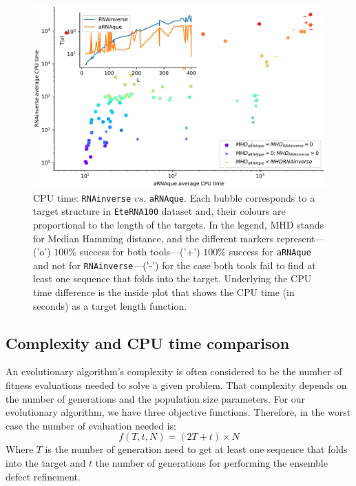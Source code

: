 \begin{figure}[t!]
	\begin{center}
		\includegraphics[width=0.98\columnwidth]{../res/images/arnaque/cpuvssuccess.pdf}
		\caption{{CPU time: \texttt{RNAinverse} $vs.$ \texttt{aRNAque}. Each bubble corresponds to a target structure in \texttt{EteRNA100} dataset and, their colours are proportional to the length of the targets. In the legend, MHD stands for Median Hamming distance, and the different markers represent---('o') $100\%$ success for both tools---('+') $100\%$ success for \texttt{aRNAque} and not for \texttt{RNAinverse}---('-') for the case both tools fail to find at least one sequence that folds into the target. Underlying the CPU time difference is the inside plot that shows the CPU time (in seconds) as a target length function.}}
		\label{719148}
	\end{center}
\end{figure}
\subsection{Complexity and CPU time comparison}
{\label{101705}}

An evolutionary algorithm's complexity is often considered to be the number of fitness evaluations needed to solve a given problem. That complexity depends on the number of generations and the population size parameters. For our evolutionary algorithm, we have three objective functions. Therefore, in the worst case the number of evaluation needed is:~ \[f\left(T,t,N\right)=\left(2T+t\right)\times N\]
Where \(T\) is the number of generation need to get at least one sequence that folds into the target and \(t\) the number of generations for performing the ensemble defect refinement.~

